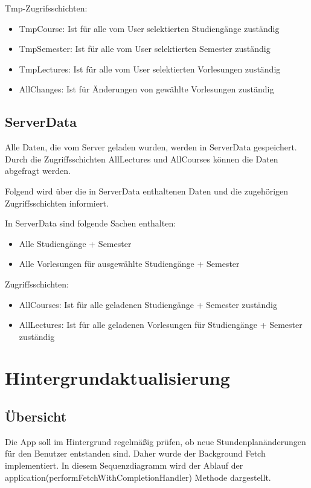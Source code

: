 Tmp-Zugrifsschichten: 
\begin{itemize}
     \item TmpCourse: Ist für alle vom User selektierten Studiengänge zuständig
     \item TmpSemester: Ist für alle vom User selektierten Semester zuständig
     \item TmpLectures: Ist für alle vom User selektierten Vorlesungen zuständig
     \item AllChanges: Ist für Änderungen von gewählte Vorlesungen zuständig 
\end{itemize}

\newpage
\section{ServerData}
Alle Daten, die vom Server geladen wurden, werden in ServerData gespeichert. Durch die Zugriffsschichten AllLectures und AllCourses können die Daten abgefragt werden.

Folgend wird über die in ServerData enthaltenen Daten und die zugehörigen Zugriffsschichten informiert.

In ServerData sind folgende Sachen enthalten:
\begin{itemize}
     \item Alle Studiengänge + Semester
     \item Alle Vorlesungen für ausgewählte Studiengänge + Semester \\     
\end{itemize}

Zugriffsschichten: 
\begin{itemize}
     \item AllCourses: Ist für alle geladenen Studiengänge + Semester zuständig
     \item AllLectures: Ist für alle geladenen Vorlesungen für Studiengänge + Semester zuständig\\
\end{itemize}

\newpage
\chapter{Hintergrundaktualisierung}
\section{Übersicht}
Die App soll im Hintergrund regelmäßig prüfen, ob neue Stundenplanänderungen für den Benutzer entstanden sind.
Daher wurde der Background Fetch implementiert. In diesem Sequenzdiagramm wird der Ablauf der application(performFetchWithCompletionHandler) Methode dargestellt. 

